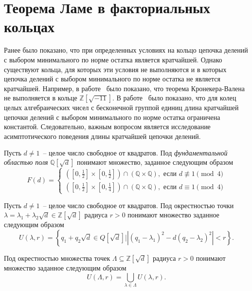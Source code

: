 \documentclass[_00_autoref.tex]{subfiles}
\begin{document}
\section{Теорема Ламе в факториальных кольцах}

Ранее было показано, что при определенных условиях на кольцо цепочка делений с выбором минимального по норме остатка является кратчайшей.
Однако существуют кольца, для которых эти условия не выполняются и в которых цепочка делений с выбором минимального по норме остатка не является кратчайшей.
Например, в работе~\cite{source:Rolletschek_1990} было показано, что теорема Кронекера-Валена не выполняется в кольце $\mathbb{Z}[\sqrt{-11}]$.
В работе~\cite{source:Cooke} было показано, что для колец целых алгебраических чисел с бесконечной группой единиц длина кратчайшей цепочки делений с выбором минимального по норме остатка ограничена константой.
Следовательно, важным вопросом является исследование асимптотического поведения длины кратчайшей цепочки делений.

\begin{definition}
    Пусть $d \neq 1$~-- целое число свободное от квадратов.
    Под \emph{фундаментальной областью поля} $\mathbb{Q}[\sqrt{d}]$ понимают множество, заданное следующим образом
    \begin{equation*}
        F(d) = \begin{cases}
            \left(
                \left[0, \frac{1}{2}\right] \times \left[0, \frac{1}{2}\right]
            \right) \cap \left(
                \mathbb{Q} \times \mathbb{Q}
            \right), \textrm{ если } d \not\equiv 1 \pmod 4\\
            \left(
                \left[0, \frac{1}{2}\right] \times \left[0, \frac{1}{4}\right]
            \right) \cap \left(
                \mathbb{Q} \times \mathbb{Q}
            \right), \textrm{ если } d \equiv 1 \pmod 4
        \end{cases}
    \end{equation*}
\end{definition}

\begin{definition}
    Пусть $d \neq 1$~-- целое число свободное от квадратов.
    Под окрестностью точки $\lambda = \lambda_1 + \lambda_2 \sqrt{d} \in \mathbb{Z}[\sqrt{d}]$ радиуса $r > 0$ понимают множество заданное следующим образом
    \begin{equation*}
        U(\lambda, r) = \left\{
            q_1 + q_2 \sqrt{d} \in Q[\sqrt{d}] \big| |(q_1 - \lambda_1)^2 - d(q_2 - \lambda_2)^2| < r
        \right\}.
    \end{equation*}

    Под окрестностью множества точек $\Lambda \subseteq \mathbb{Z}[\sqrt{d}]$ радиуса $r > 0$ понимают множество заданное следующим образом
    \begin{equation*}
        U(\Lambda, r) = \bigcup_{\lambda \in \Lambda} U(\lambda, r).
    \end{equation*}
\end{definition}
\end{document}
